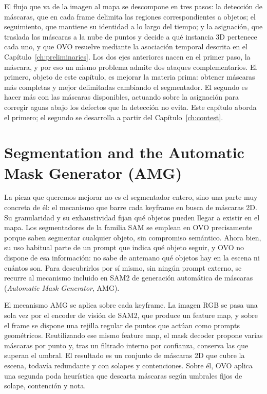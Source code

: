 El flujo que va de la imagen al mapa se descompone en tres pasos: la detección de máscaras, que
en cada frame delimita las regiones correspondientes a objetos; el seguimiento, que mantiene su
identidad a lo largo del tiempo; y la asignación, que traslada las máscaras a la nube de puntos
y decide a qué instancia 3D pertenece cada uno, y que OVO resuelve mediante la asociación
temporal descrita en el Capítulo~\ref{ch:preliminaries}. Los dos ejes anteriores nacen en el
primer paso, la máscara, y por eso un mismo problema admite dos ataques complementarios. El
primero, objeto de este capítulo, es mejorar la materia prima: obtener máscaras más completas y
mejor delimitadas cambiando el segmentador. El segundo es hacer más con las máscaras
disponibles, actuando sobre la asignación para corregir aguas abajo los defectos que la
detección no evita. Este capítulo aborda el primero; el segundo se desarrolla a partir del
Capítulo~\ref{ch:contest}.

\section{Segmentation and the Automatic Mask Generator (AMG)}
\label{sec:seg_amg}

La pieza que queremos mejorar no es el segmentador entero, sino una parte muy concreta de él: el
mecanismo que barre cada keyframe en busca de máscaras 2D. Su granularidad y su exhaustividad
fijan qué objetos pueden llegar a existir en el mapa. Los segmentadores de la familia SAM se
emplean en OVO precisamente porque saben segmentar cualquier objeto, sin compromiso semántico.
Ahora bien, su uso habitual parte de un prompt que indica qué objeto seguir, y OVO no dispone de
esa información: no sabe de antemano qué objetos hay en la escena ni cuántos son. Para
descubrirlos por sí mismo, sin ningún prompt externo, se recurre al mecanismo incluido en SAM2 de
generación automática de máscaras (\emph{Automatic Mask Generator}, AMG).

El mecanismo AMG se aplica sobre cada keyframe. La imagen RGB se pasa una sola vez por el encoder
de visión de SAM2, que produce un feature map, y sobre el frame se dispone una rejilla regular de
puntos que actúan como prompts geométricos. Reutilizando ese mismo feature map, el mask decoder
propone varias máscaras por punto y, tras un filtrado interno por confianza, conserva las que
superan el umbral. El resultado es un conjunto de máscaras 2D que cubre la escena, todavía
redundante y con solapes y contenciones. Sobre él, OVO aplica una segunda poda heurística que
descarta máscaras según umbrales fijos de solape, contención y nota.

